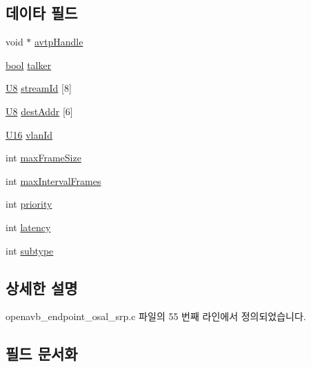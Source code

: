 \subsection*{데이타 필드}
\begin{DoxyCompactItemize}
\item 
void $\ast$ \hyperlink{structstr_elem__t_a4b9351eb0c3d027b65d2babae355d2c1}{avtp\+Handle}
\item 
\hyperlink{avb__gptp_8h_af6a258d8f3ee5206d682d799316314b1}{bool} \hyperlink{structstr_elem__t_a6be038e79a0f77feb1e908233b35195a}{talker}
\item 
\hyperlink{openavb__types__base__pub_8h_aa63ef7b996d5487ce35a5a66601f3e73}{U8} \hyperlink{structstr_elem__t_a196eef9dc008c0d002814536cf5c960a}{stream\+Id} \mbox{[}8\mbox{]}
\item 
\hyperlink{openavb__types__base__pub_8h_aa63ef7b996d5487ce35a5a66601f3e73}{U8} \hyperlink{structstr_elem__t_a1bedd6e7cd5639e606b06cd7103eee6a}{dest\+Addr} \mbox{[}6\mbox{]}
\item 
\hyperlink{openavb__types__base__pub_8h_a0a0a322d5fa4a546d293a77ba8b4a71f}{U16} \hyperlink{structstr_elem__t_a252d0c6d3b370c0cd1d20702594357bd}{vlan\+Id}
\item 
int \hyperlink{structstr_elem__t_ac32e324cfed1a8889e1aad9ca573806e}{max\+Frame\+Size}
\item 
int \hyperlink{structstr_elem__t_a0a60e10f690833412bcbc076923a8420}{max\+Interval\+Frames}
\item 
int \hyperlink{structstr_elem__t_acec9ce2df15222151ad66fcb1d74eb9f}{priority}
\item 
int \hyperlink{structstr_elem__t_a9c5bf07170b5d91cfb44d4bfd0517128}{latency}
\item 
int \hyperlink{structstr_elem__t_a7aacd365cfc725fe569f28df862fa5eb}{subtype}
\end{DoxyCompactItemize}


\subsection{상세한 설명}


openavb\+\_\+endpoint\+\_\+osal\+\_\+srp.\+c 파일의 55 번째 라인에서 정의되었습니다.



\subsection{필드 문서화}
